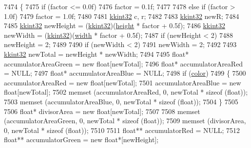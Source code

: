 \begin{DoxyCode}
7474 \{
7475   \textcolor{keywordflow}{if}  (factor <= 0.0f)  
7476     factor = 0.1f;
7477   
7478   \textcolor{keywordflow}{else} \textcolor{keywordflow}{if}  (factor > 1.0f)
7479     factor = 1.0f;
7480 
7481   \hyperlink{namespace_k_k_b_a8fa4952cc84fda1de4bec1fbdd8d5b1b}{kkint32}  c, r;
7482 
7483   \hyperlink{namespace_k_k_b_a8fa4952cc84fda1de4bec1fbdd8d5b1b}{kkint32}  newR;
7484 
7485   \hyperlink{namespace_k_k_b_a8fa4952cc84fda1de4bec1fbdd8d5b1b}{kkint32}  newHeight = (\hyperlink{namespace_k_k_b_a8fa4952cc84fda1de4bec1fbdd8d5b1b}{kkint32})(\hyperlink{class_k_k_b_1_1_raster_af39ff189de4fbb6de98392e187efafb7}{height} * factor + 0.5f);
7486   \hyperlink{namespace_k_k_b_a8fa4952cc84fda1de4bec1fbdd8d5b1b}{kkint32}  newWidth  = (\hyperlink{namespace_k_k_b_a8fa4952cc84fda1de4bec1fbdd8d5b1b}{kkint32})(\hyperlink{class_k_k_b_1_1_raster_ae0bcc103e191c3421d7692dc69ceb554}{width}  * factor + 0.5f);
7487   \textcolor{keywordflow}{if}  (newHeight < 2)
7488     newHeight = 2;
7489 
7490   \textcolor{keywordflow}{if}  (newWidth < 2)
7491     newWidth = 2;
7492 
7493   \hyperlink{namespace_k_k_b_a8fa4952cc84fda1de4bec1fbdd8d5b1b}{kkint32}  newTotal  = newHeight * newWidth;
7494 
7495   \textcolor{keywordtype}{float}*  accumulatorAreaGreen = \textcolor{keyword}{new} \textcolor{keywordtype}{float}[newTotal];
7496   \textcolor{keywordtype}{float}*  accumulatorAreaRed   = NULL;
7497   \textcolor{keywordtype}{float}*  accumulatorAreaBlue  = NULL;
7498   \textcolor{keywordflow}{if}  (\hyperlink{class_k_k_b_1_1_raster_a482384d89cc53fa4f36276307c746854}{color})
7499   \{
7500     accumulatorAreaRed   = \textcolor{keyword}{new} \textcolor{keywordtype}{float}[newTotal];
7501     accumulatorAreaBlue  = \textcolor{keyword}{new} \textcolor{keywordtype}{float}[newTotal];
7502     memset (accumulatorAreaRed,  0, newTotal * \textcolor{keyword}{sizeof} (\textcolor{keywordtype}{float}));
7503     memset (accumulatorAreaBlue, 0, newTotal * \textcolor{keyword}{sizeof} (\textcolor{keywordtype}{float}));
7504   \}
7505 
7506   \textcolor{keywordtype}{float}*  divisorArea          = \textcolor{keyword}{new} \textcolor{keywordtype}{float}[newTotal];
7507 
7508   memset (accumulatorAreaGreen, 0, newTotal * \textcolor{keyword}{sizeof} (\textcolor{keywordtype}{float}));
7509   memset (divisorArea,          0, newTotal * \textcolor{keyword}{sizeof} (\textcolor{keywordtype}{float}));
7510 
7511   \textcolor{keywordtype}{float}** accumulatorRed   = NULL;
7512   \textcolor{keywordtype}{float}** accumulatorGreen = \textcolor{keyword}{new} \textcolor{keywordtype}{float}*[newHeight];

\end{DoxyCode}
